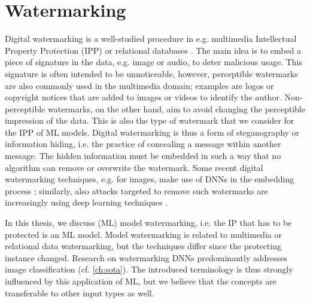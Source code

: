 \section{Watermarking} \label{sec:background:watermarking}
Digital watermarking is a well-studied procedure in e.g. multimedia Intellectual Property Protection (IPP) \cite{kahng_watermarking_1998} or relational databases \cite{kamran_comprehensive_2018}. The main idea is to embed a piece of signature in the data, e.g. image or audio, to deter malicious usage. This signature is often intended to be unnoticeable, however, perceptible watermarks are also commonly used in the multimedia domain; examples are logos or copyright notices that are added to images or videos to identify the author.
Non-perceptible watermarks, on the other hand, aim to avoid changing the perceptible impression of the data. This is also the type of watermark that we consider for the IPP of ML models. Digital watermarking is thus a form of steganography or information hiding, i.e. the practice of concealing a message within another message.
The hidden information must be embedded in such a way that no algorithm can remove or overwrite the watermark. Some recent digital watermarking techniques, e.g. for images, make use of DNNs in the embedding process \cite{zhong_automated_2020}; similarly, also attacks targeted to remove such watermarks are increasingly using deep learning techniques \cite{sharma_robust_2020}.



In this thesis, we discuss (ML) model watermarking, i.e. the IP that has to be protected is an ML model. Model watermarking is related to multimedia or relational data watermarking, but the techniques differ since the protecting instance changed. 
Research on watermarking DNNs predominantly addresses image classification (cf. \cref{ch:sota}). The introduced terminology is thus strongly influenced by this application of ML, but we believe that the concepts are transferable to other input types as well.

